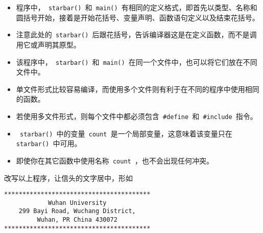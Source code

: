 \begin{frame}[fragile]
\begin{itemize}
\item
程序中，\lstinline| starbar() |和\lstinline| main() |有相同的定义格式，即首先以类型、名称和圆括号开始，接着是开始花括号、变量声明、函数语句定义以及结束花括号。\\[0.1in]
\item 
注意此处的\lstinline| starbar() |后跟花括号，告诉编译器这是在定义函数，而不是调用它或声明其原型。
\end{itemize}

\end{frame}

\begin{frame}[fragile]
\begin{itemize}
\item
该程序中，\lstinline| starbar() |和\lstinline| main() |在同一个文件中，也可以将它们放在不同文件中。\\[0.1in]
\item 
单文件形式比较容易编译，而使用多个文件则有利于在不同的程序中使用相同的函数。\\[0.1in]
\item 
若使用多文件形式，则每个文件中都必须包含\lstinline| #define |和\lstinline| #include |指令。
\end{itemize}

\end{frame}

\begin{frame}[fragile]
\begin{itemize}
\item
\lstinline| starbar() |中的变量\lstinline| count |是一个局部变量，这意味着该变量只在\lstinline| starbar() |中可用。\\[0.1in]
\item 
即使你在其它函数中使用名称\lstinline| count |，也不会出现任何冲突。
\end{itemize}

\end{frame}

\begin{frame}[fragile]
改写以上程序，让信头的文字居中，形如
\begin{lstlisting}
****************************************
            Wuhan University
    299 Bayi Road, Wuchang District,
         Wuhan, PR China 430072
****************************************
\end{lstlisting}
\end{frame}

